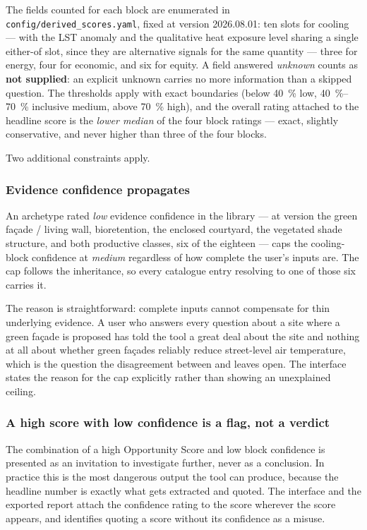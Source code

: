 The fields counted for each block are enumerated in
\texttt{config/derived\_scores.yaml}, fixed at version 2026.08.01: ten slots
for cooling --- with the LST anomaly and the qualitative heat
exposure level sharing a single either-of slot, since they are alternative
signals for the same quantity --- three for energy, four for economic, and six
for equity. A field answered \emph{unknown} counts as \textbf{not supplied}:
an explicit unknown carries no more information than a skipped question. The
thresholds apply with exact boundaries (below \SI{40}{\percent} low,
\SIrange{40}{70}{\percent} inclusive medium, above \SI{70}{\percent} high),
and the overall rating attached to the headline score is the \emph{lower
median} of the four block ratings --- exact, slightly conservative, and never
higher than three of the four blocks.

Two additional constraints apply.

\subsubsection{Evidence confidence propagates}
\label{sec:evidence-propagation}

An archetype rated \emph{low} evidence confidence in the library --- at version
\methver{} the green fa\c{c}ade / living wall, bioretention, the enclosed
courtyard, the vegetated shade structure, and both productive classes, six of
the eighteen --- caps the cooling-block confidence at \emph{medium} regardless
of how complete the user's inputs are. The cap follows the inheritance, so
every catalogue entry resolving to one of those six carries it.

The reason is straightforward: complete inputs cannot compensate for thin
underlying evidence. A user who answers every question about a site where a
green fa\c{c}ade is proposed has told the tool a great deal about the site and
nothing at all about whether green fa\c{c}ades reliably reduce street-level air
temperature, which is the question the disagreement between
\textcite{keravec2026} and \textcite{zolch2016} leaves open. The interface
states the reason for the cap explicitly rather than showing an unexplained
ceiling.

\subsubsection{A high score with low confidence is a flag, not a verdict}

The combination of a high Opportunity Score and low block confidence is
presented as an invitation to investigate further, never as a conclusion. In
practice this is the most dangerous output the tool can produce, because the
headline number is exactly what gets extracted and quoted. The interface and
the exported report attach the confidence rating to the score wherever the
score appears, and  identifies quoting a score without its
confidence as a misuse.


